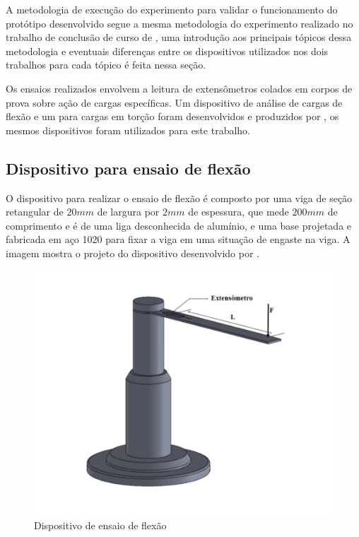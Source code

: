 A metodologia de execução do experimento para validar o funcionamento do protótipo desenvolvido segue a mesma metodologia do experimento realizado no trabalho de conclusão
de curso de \autocite{Minela2017}, uma introdução aos principais tópicos dessa metodologia e eventuais diferenças entre os dispositivos utilizados nos dois trabalhos para cada tópico é feita nessa seção.

Os ensaios realizados envolvem a leitura de extensômetros colados em corpos de prova sobre ação de cargas específicas. Um dispositivo de análise de cargas de flexão e
um para cargas em torção foram desenvolvidos e produzidos por \autocite{Minela2017}, os mesmos dispositivos foram utilizados para este trabalho.

\subsection{Dispositivo para ensaio de flexão}

O dispositivo para realizar o ensaio de flexão é composto por uma viga de seção retangular de $20mm$ de largura por $2mm$ de espessura, que mede $200mm$
de comprimento e é de uma liga desconhecida de alumínio, e uma base projetada e fabricada em aço 1020 para fixar a viga em uma situação de engaste na viga.
A imagem mostra o projeto do dispositivo desenvolvido por \autocite{Minela2017}.

\begin{figure}[htb]
	\caption{\label{fig:2049} Dispositivo de ensaio de flexão}
	\begin{center}
		\includegraphics[width=\textwidth]{pictures/2049.png}
	\end{center}
\end{figure}

